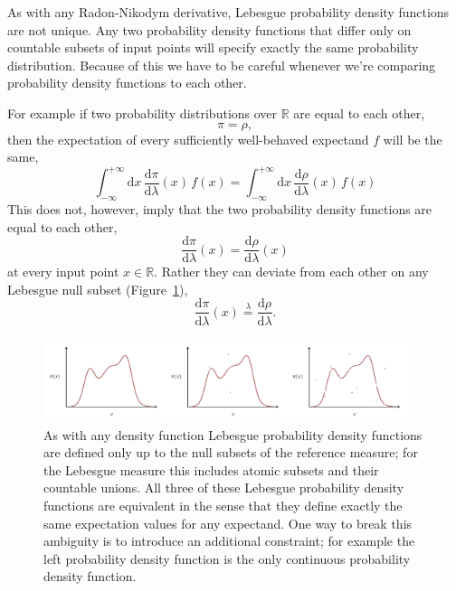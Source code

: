\documentclass[
  letterpaper,
  DIV=11,
  numbers=noendperiod]{scrartcl}
\begin{document}
As with any Radon-Nikodym derivative, Lebesgue probability density
functions are not unique. Any two probability density functions that
differ only on countable subsets of input points will specify exactly
the same probability distribution. Because of this we have to be careful
whenever we're comparing probability density functions to each other.

For example if two probability distributions over \(\mathbb{R}\) are
equal to each other, \[
\pi = \rho,
\] then the expectation of every sufficiently well-behaved expectand
\(f\) will be the same, \[
\int_{-\infty}^{+\infty} \mathrm{d} x \,
\frac{ \mathrm{d} \pi }{ \mathrm{d} \lambda}(x)
\, f(x)
=
\int_{-\infty}^{+\infty} \mathrm{d} x \,
\frac{ \mathrm{d} \rho }{ \mathrm{d} \lambda}(x)
\, f(x)
\] This does not, however, imply that the two probability density
functions are equal to each other, \[
\frac{ \mathrm{d} \pi }{ \mathrm{d} \lambda}(x)
=
\frac{ \mathrm{d} \rho }{ \mathrm{d} \lambda}(x)
\] at every input point \(x \in \mathbb{R}\). Rather they can deviate
from each other on any Lebesgue null subset
(Figure~\ref{fig-equivalent-density-functions}), \[
\frac{ \mathrm{d} \pi }{ \mathrm{d} \lambda}(x)
\overset{\lambda}{=}
\frac{ \mathrm{d} \rho }{ \mathrm{d} \lambda}.
\]

\begin{figure}

{\centering \includegraphics[width=0.95\textwidth,height=\textheight]{figures/equivalent_density_functions/equivalent_density_functions.pdf}

}

\caption{\label{fig-equivalent-density-functions}As with any density
function Lebesgue probability density functions are defined only up to
the null subsets of the reference measure; for the Lebesgue measure this
includes atomic subsets and their countable unions. All three of these
Lebesgue probability density functions are equivalent in the sense that
they define exactly the same expectation values for any expectand. One
way to break this ambiguity is to introduce an additional constraint;
for example the left probability density function is the only continuous
probability density function.}

\end{figure}
\end{document}
